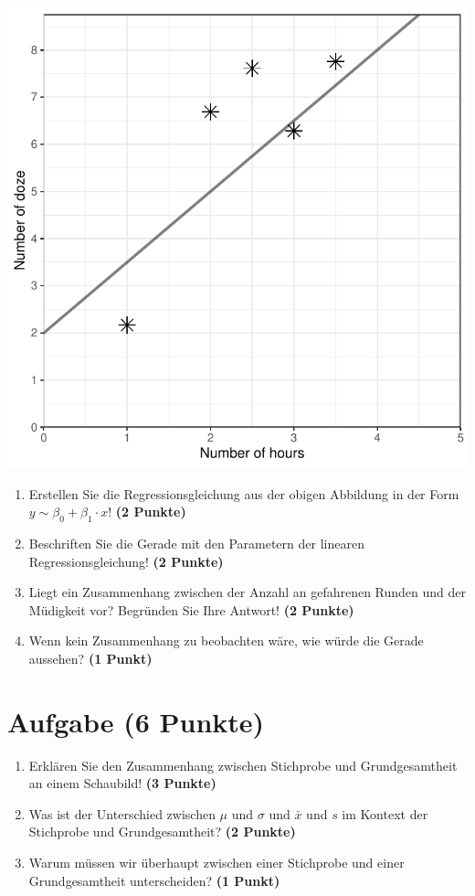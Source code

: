\documentclass[a4paper, 10pt]{scrartcl}\usepackage[]{graphicx}\usepackage[]{xcolor}
\makeatletter
\def\maxwidth{ %
  \ifdim\Gin@nat@width>\linewidth
    \linewidth
  \else
    \Gin@nat@width
  \fi
}
\makeatother
\begin{document}
{\centering \includegraphics[width=\maxwidth]{img/scatter-02-1} 

}




\begin{enumerate}
\item Erstellen Sie die Regressionsgleichung aus der obigen Abbildung in
  der Form $y \sim \beta_0 + \beta_1 \cdot x$! \textbf{(2 Punkte)}
\item Beschriften Sie die Gerade mit den Parametern der linearen
  Regressionsgleichung! \textbf{(2 Punkte)}
\item Liegt ein Zusammenhang zwischen der Anzahl an gefahrenen Runden und
  der M{\"u}digkeit vor? Begr{\"u}nden Sie Ihre Antwort! \textbf{(2 Punkte)}
\item Wenn kein Zusammenhang zu beobachten w{\"a}re, wie w{\"u}rde die Gerade aussehen? \textbf{(1 Punkt)}
\end{enumerate} 
\clearpage

\section{Aufgabe \hfill (6 Punkte)}

\begin{enumerate}
\item Erkl{\"a}ren Sie den Zusammenhang zwischen Stichprobe und Grundgesamtheit
  an einem Schaubild! \textbf{(3 Punkte)}
\item Was ist der Unterschied zwischen $\mu$ und $\sigma$ und $\bar{x}$ und
  $s$ im Kontext der Stichprobe und Grundgesamtheit? \textbf{(2 Punkte)}
\item Warum m{\"u}ssen wir {\"u}berhaupt zwischen einer Stichprobe und einer
  Grundgesamtheit unterscheiden? \textbf{(1 Punkt)}
\end{enumerate} 
\clearpage
\end{document}
